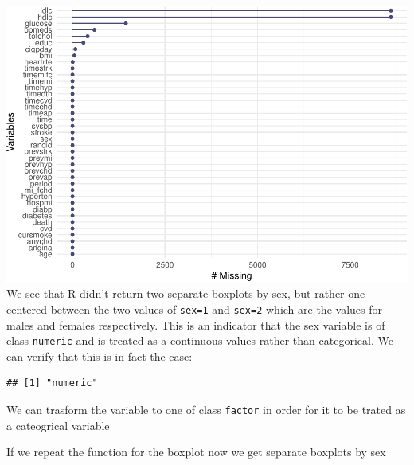 \documentclass[
]{book}
\newenvironment{Shaded}{\begin{snugshade}}{\end{snugshade}}
\newcommand{\CommentTok}[1]{\textcolor[rgb]{0.56,0.35,0.01}{\textit{#1}}}
\newcommand{\DataTypeTok}[1]{\textcolor[rgb]{0.13,0.29,0.53}{#1}}
\newcommand{\KeywordTok}[1]{\textcolor[rgb]{0.13,0.29,0.53}{\textbf{#1}}}
\newcommand{\NormalTok}[1]{#1}
\newcommand{\OperatorTok}[1]{\textcolor[rgb]{0.81,0.36,0.00}{\textbf{#1}}}
\newcommand{\StringTok}[1]{\textcolor[rgb]{0.31,0.60,0.02}{#1}}
\begin{document}
\includegraphics{adv_epi_analysis_files/figure-latex/unnamed-chunk-171-1.pdf}
We see that R didn't return two separate boxplots by sex, but rather one centered between the two values of \texttt{sex=1} and \texttt{sex=2} which are the values for males and females respectively. This is an indicator that the sex variable is of class \texttt{numeric} and is treated as a continuous values rather than categorical. We can verify that this is in fact the case:

\begin{Shaded}
\end{Shaded}

\begin{verbatim}
## [1] "numeric"
\end{verbatim}

We can trasform the variable to one of class \texttt{factor} in order for it to be trated as a cateogrical variable

\begin{Shaded}
\end{Shaded}

If we repeat the function for the boxplot now we get separate boxplots by sex

\begin{Shaded}
\end{Shaded}
\end{document}
